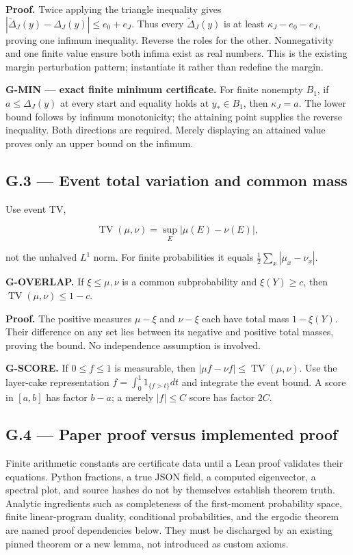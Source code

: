 \documentclass[
  11pt,
  a4paper,
]{article}
\begin{document}
\textbf{Proof.} Twice applying the triangle inequality gives
\(|\widetilde\Delta_J(y)-\Delta_J(y)|\le e_0+e_J\). Thus every
\(\widetilde\Delta_J(y)\) is at least \(\kappa_J-e_0-e_J\), proving one
infimum inequality. Reverse the roles for the other. Nonnegativity and
one finite value ensure both infima exist as real numbers. This is the
existing margin perturbation pattern; instantiate it rather than
redefine the margin.

\textbf{G-MIN --- exact finite minimum certificate.} For finite nonempty
\(B_1\), if \(a\le\Delta_J(y)\) at every start and equality holds at
\(y_*\in B_1\), then \(\kappa_J=a\). The lower bound follows by infimum
monotonicity; the attaining point supplies the reverse inequality. Both
directions are required. Merely displaying an attained value proves only
an upper bound on the infimum.

\subsection{G.3 --- Event total variation and common
mass}\label{g.3-event-total-variation-and-common-mass}

Use event TV,

\[\operatorname{TV}(\mu,\nu)=\sup_E|\mu(E)-\nu(E)|,\]

not the unhalved \(L^1\) norm. For finite probabilities it equals
\(\frac12\sum_x|\mu_x-\nu_x|\).

\textbf{G-OVERLAP.} If \(\xi\le\mu,\nu\) is a common subprobability and
\(\xi(Y)\ge c\), then \(\operatorname{TV}(\mu,\nu)\le1-c\).

\textbf{Proof.} The positive measures \(\mu-\xi\) and \(\nu-\xi\) each
have total mass \(1-\xi(Y)\). Their difference on any set lies between
its negative and positive total masses, proving the bound. No
independence assumption is involved.

\textbf{G-SCORE.} If \(0\le f\le1\) is measurable, then
\(|\mu f-\nu f|\le\operatorname{TV}(\mu,\nu)\). Use the layer-cake
representation \(f=\int_0^1 1_{\{f>t\}}dt\) and integrate the event
bound. A score in \([a,b]\) has factor \(b-a\); a merely \(|f|\le C\)
score has factor \(2C\).

\subsection{G.4 --- Paper proof versus implemented
proof}\label{g.4-paper-proof-versus-implemented-proof}

Finite arithmetic constants are certificate data until a Lean proof
validates their equations. Python fractions, a true JSON field, a
computed eigenvector, a spectral plot, and source hashes do not by
themselves establish theorem truth. Analytic ingredients such as
completeness of the first-moment probability space, finite
linear-program duality, conditional probabilities, and the ergodic
theorem are named proof dependencies below. They must be discharged by
an existing pinned theorem or a new lemma, not introduced as custom
axioms.
\end{document}
